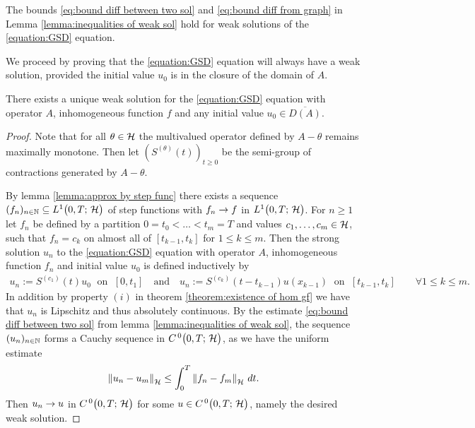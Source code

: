 \begin{corollary}
	The bounds \eqref{eq:bound diff between two sol} and
	\eqref{eq:bound diff from graph} in Lemma 
	\ref{lemma:inequalities of weak sol} hold for
	weak solutions of the \ref{equation:GSD} equation.
\end{corollary}

We proceed by proving that the \ref{equation:GSD} equation
will always have a weak solution, provided the initial
value $ u_0 $ is in the closure of the domain of $ A $.

\begin{theorem}
	There exists a unique weak solution for the \ref{equation:GSD} equation
	with operator $ A $, inhomogeneous function $ f $ and any initial value
	$ u_0\in\overline{D(A)} $.
\end{theorem}
\begin{proof}
	Note that for all $ \theta \in \mathcal{H} $ the multivalued operator defined
	by $ A-\theta $ remains maximally monotone.
	Then let $ (S^{(\theta)}(t))_{t \geq 0} $ be the semi-group of contractions
	generated by $ A-\theta $.\smallskip
	
	By lemma \ref{lemma:approx by step func} there exists a sequence
	$ (f_n)_{n\in\mathbb{N}}\subseteq L^{1}\big(0,T;\,\mathcal{H}\big) $ of step functions
	with $ f_n\rightarrow f $ in $ L^{1}\big(0,T;\,\mathcal{H}\big) $. For $ n\geq 1 $
	let $ f_n $ be defined by a partition $ 0=t_0<\ldots<t_m=T $
	and values $ c_1,\ldots,c_m\in \mathcal{H} $, such that $ f_n=c_k $ on almost all 
	of $ [t_{k-1}, t_k] $ for $ 1\leq k\leq m $. Then the
	strong solution $ u_n $ to the \ref{equation:GSD} equation
	with operator $ A$, inhomogeneous function $ f_n $
	and initial value $ u_0 $ is defined inductively by
	\begin{align*}
		u_n:=S^{(c_1)}(t)u_0\;\text{ on }\;[0,t_1]
		\quad\text{and}\quad
		u_n:=S^{(c_k)}(t-t_{k-1})u(x_{k-1})\;\text{ on }\;[t_{k-1},t_k]
		\qquad\forall 1\leq k\leq m.
	\end{align*}
	In addition by property $ (i) $ in theorem
	\ref{theorem:existence of hom gf} we have that
	$ u_n $ is Lipschitz and thus absolutely continuous.
	By the estimate \eqref{eq:bound diff between two sol} 
	from lemma \ref{lemma:inequalities of weak sol},
	the sequence $ (u_n)_{n\in\mathbb{N}} $ forms a Cauchy sequence in
	$ C^{\, 0}\big(0,T;\,\mathcal{H}\big) $, as we have the uniform estimate
	\begin{align*}
		\left\Vert u_n-u_m\right\Vert_{\mathcal{H}}
		\leq \int_0^T \left\Vert f_n-f_m\right\Vert_{\mathcal{H}}\,dt	.
	\end{align*}
	Then $ u_n\rightarrow u $ in $ C^{\, 0}\big(0,T;\,\mathcal{H}\big) $ for some $ u\in C^{\, 0}\big(0,T;\,\mathcal{H}\big) $,
	namely the desired weak solution.
\end{proof}


